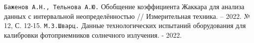 \begin{thebibliography}{}
	  \texttt{Баженов А.Н., Тельнова А.Ю.} Обобщение коэффициента Жаккара для анализа данных с интервальной неопределённостью // Измерительная техника. – 2022. № 12, С. 12-15.
	  \texttt{М.З.Шварц.} Данные технологических испытаний оборудования для калибровки фотоприемников солнечного излучения. - 2022.
\end{thebibliography}